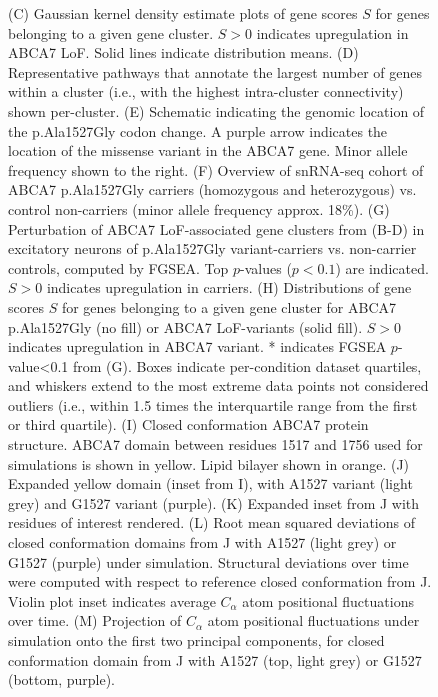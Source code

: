 \begin{figure}[ht]
{        (C) Gaussian kernel density estimate plots of gene scores $S$ for genes belonging to a given gene cluster. $S>0$ indicates upregulation in ABCA7 LoF. Solid lines indicate distribution means.
        (D) Representative pathways that annotate the largest number of genes within a cluster (i.e., with the highest intra-cluster connectivity) shown per-cluster. 
        (E) Schematic indicating the genomic location of the p.Ala1527Gly codon change. A purple arrow indicates the location of the missense variant in the ABCA7 gene. Minor allele frequency shown to the right. 
        (F) Overview of snRNA-seq cohort of ABCA7 p.Ala1527Gly carriers (homozygous and heterozygous) vs. control non-carriers (minor allele frequency approx. 18\%).
        (G) Perturbation of ABCA7 LoF-associated gene clusters from (B-D) in excitatory neurons of p.Ala1527Gly variant-carriers vs. non-carrier controls, computed by FGSEA. Top $p$-values ($p<0.1$) are indicated. $S>0$ indicates upregulation in carriers.
        (H) Distributions of gene scores $S$ for genes belonging to a given gene cluster for ABCA7 p.Ala1527Gly (no fill) or ABCA7 LoF-variants (solid fill). $S>0$ indicates upregulation in ABCA7 variant. * indicates FGSEA $p$-value<0.1 from (G). Boxes indicate per-condition dataset quartiles, and whiskers extend to the most extreme data points not considered outliers (i.e., within 1.5 times the interquartile range from the first or third quartile).
        (I) Closed conformation ABCA7 protein structure. ABCA7 domain between residues 1517 and 1756 used for simulations is shown in yellow. Lipid bilayer shown in orange.
        (J) Expanded yellow domain (inset from I), with A1527 variant (light grey) and G1527 variant (purple).
        (K) Expanded inset from J with residues of interest rendered.
        (L) Root mean squared deviations of closed conformation domains from J with A1527 (light grey) or G1527 (purple) under simulation. Structural deviations over time were computed with respect to reference closed conformation from J. Violin plot inset indicates average $C_\alpha$ atom positional fluctuations over time.
        (M) Projection of $C_\alpha$ atom positional fluctuations under simulation onto the first two principal components, for closed conformation domain from J with A1527 (top, light grey) or G1527 (bottom, purple). 
    }
    \label{fig:main_atlas}
\end{figure}
